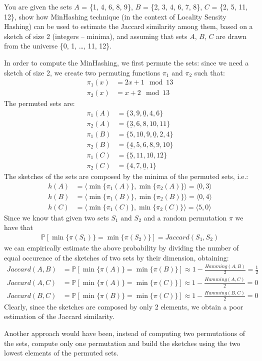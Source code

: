 \exercise

You are given the sets $A$ = \{1, 4, 6, 8, 9\}, $B$ = \{2, 3, 4, 6, 7, 8\}, $C$ =
\{2, 5, 11, 12\}, show how MinHashing technique (in the context of Locality
Sensity Hashing) can be used to estimate the Jaccard similarity among them,
based on a sketch of size 2 (integers -- minima), and assuming that sets $A$,
$B$, $C$ are drawn from the universe \{0, 1, \dots, 11, 12\}.

\solution In order to compute the MinHashing, we first permute the sets: since
we need a sketch of size 2, we create two permuting functions $\pi_1$ and
$\pi_2$ such that:
%
\begin{align*}
  \pi_1(x) &= 2x + 1 \mod 13 \\
  \pi_2(x) &= x + 2 \mod 13
\end{align*}
%
The permuted sets are:
%
\begin{align*}
  \pi_1(A) &= \{ 3, 9, \underline{0}, 4, 6 \} \\
  \pi_2(A) &= \{ \underline{3}, 6, 8, 10, 11 \} \\
  \pi_1(B) &= \{ 5, 10, 9, \underline{0}, 2, 4 \} \\
  \pi_2(B) &= \{ \underline{4}, 5, 6, 8, 9, 10 \} \\
  \pi_1(C) &= \{ \underline{5}, 11, 10, 12 \} \\
  \pi_2(C) &= \{ 4, 7, \underline{0}, 1 \}
\end{align*}
%
The sketches of the sets are composed by the minima of the permuted sets, i.e.:
%
\begin{align*}
  h(A) &= \langle \min \{ \pi_1(A) \}, \min \{ \pi_2(A) \}\rangle =
  \langle 0, 3 \rangle \\
  h(B) &= \langle \min \{ \pi_1(B) \}, \min \{ \pi_2(B) \}\rangle =
  \langle 0, 4 \rangle \\
  h(C) &= \langle \min \{ \pi_1(C) \}, \min \{ \pi_2(C) \}\rangle =
  \langle 5, 0 \rangle
\end{align*}
%
Since we know that given two sets $S_1$ and $S_2$ and a random permutation $\pi$
we have that
%
\begin{align*}
  \mathbb{P}[ \min \{ \pi(S_1) \} = \min \{ \pi(S_2) \} ] = Jaccard(S_1, S_2)
\end{align*}
%
we can empirically estimate the above probability by dividing the number of
equal occurence of the sketches of two sets by their dimension, obtaining:
%
\begin{align*}
  Jaccard(A, B) &= \mathbb{P}[ \min \{ \pi(A) \} = \min \{ \pi(B) \} ]
  \approx 1 - \frac{Hamming(A, B)}{2} = \frac{1}{2} \\
  Jaccard(A, C) &= \mathbb{P}[ \min \{ \pi(A) \} = \min \{ \pi(C) \} ]
  \approx 1 - \frac{Hamming(A, C)}{2} = 0 \\
  Jaccard(B, C) &= \mathbb{P}[ \min \{ \pi(B) \} = \min \{ \pi(C) \} ]
  \approx 1 - \frac{Hamming(B, C)}{2} = 0
\end{align*}
%
Clearly, since the sketches are composed by only 2 elements, we obtain a poor
estimation of the Jaccard similarity.

Another approach would have been, instead of computing two permutations of the
sets, compute only one permutation and build the sketches using the two lowest
elements of the permuted sets.
